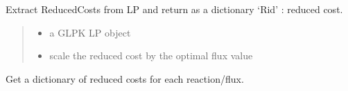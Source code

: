 \documentclass[letterpaper,12pt,english]{sphinxmanual}
\begin{document}

\begin{fulllineitems}
\label{\detokenize{api/solvers:cbmpy.CBGLPK.glpk_getReducedCosts}}
\pysigstartsignatures
\pysiglinewithargsret
{}
{\sphinxparamcomma {}}
{}
\pysigstopsignatures
\sphinxAtStartPar
Extract ReducedCosts from LP and return as a dictionary ‘Rid’ : reduced cost.
\begin{quote}\begin{description}
\begin{itemize}
\item {} 
\sphinxAtStartPar
{} \textendash{} a GLPK LP object

\item {} 
\sphinxAtStartPar
{} \textendash{} scale the reduced cost by the optimal flux value

\end{itemize}

\end{description}\end{quote}

\end{fulllineitems}


\begin{fulllineitems}
\label{\detokenize{api/solvers:cbmpy.CBGLPK.getReducedCosts}}
\pysigstartsignatures
\pysiglinewithargsret
{}
{}
{}
\pysigstopsignatures
\sphinxAtStartPar
Get a dictionary of reduced costs for each reaction/flux.

\end{fulllineitems}

\end{document}
